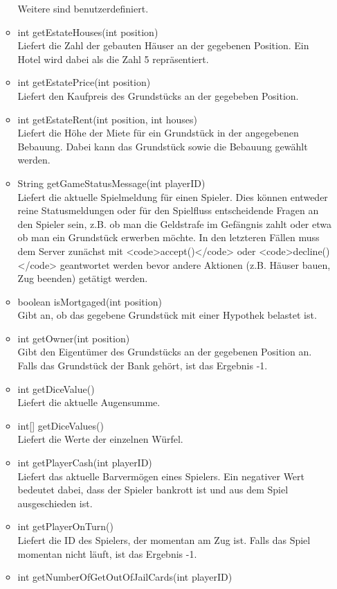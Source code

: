 \documentclass[a4paper,10pt]{article}
\begin{document}
\begin{itemize}
\begin{itemize}
\begin{description}
\end{description}
Weitere sind benutzerdefiniert.
\item int getEstateHouses(int position) \\
Liefert die Zahl der gebauten Häuser an der gegebenen Position. Ein Hotel wird dabei als die Zahl 5 repräsentiert.
\item int getEstatePrice(int position) \\
Liefert den Kaufpreis des Grundstücks an der gegebeben Position.
\item int getEstateRent(int position, int houses) \\
Liefert die Höhe der Miete für ein Grundstück in der angegebenen Bebauung. Dabei kann das Grundstück sowie die Bebauung gewählt werden.
\item String getGameStatusMessage(int playerID) \\
Liefert die aktuelle Spielmeldung für einen Spieler. Dies können entweder reine Statusmeldungen
oder für den Spielfluss entscheidende Fragen an den Spieler sein, z.B. ob man die Geldstrafe im Gefängnis zahlt oder etwa ob
man ein Grundstück erwerben möchte. In den letzteren Fällen muss dem Server zunächst mit <code>accept()</code> oder <code>decline()</code>
geantwortet werden bevor andere Aktionen (z.B. Häuser bauen, Zug beenden) getätigt werden.
\item boolean isMortgaged(int position) \\
Gibt an, ob das gegebene Grundstück mit einer Hypothek belastet ist.
\item int getOwner(int position) \\
Gibt den Eigentümer des Grundstücks an der gegebenen Position an. Falls das Grundstück der Bank gehört, ist das Ergebnis -1.
\item int getDiceValue() \\
Liefert die aktuelle Augensumme.
\item int[] getDiceValues() \\
Liefert die Werte der einzelnen Würfel.
\item int getPlayerCash(int playerID) \\
Liefert das aktuelle Barvermögen eines Spielers. Ein negativer Wert bedeutet dabei, dass der Spieler bankrott ist und aus dem Spiel ausgeschieden ist.
\item int getPlayerOnTurn() \\
Liefert die ID des Spielers, der momentan am Zug ist. Falls das Spiel
momentan nicht läuft, ist das Ergebnis -1.
\item int getNumberOfGetOutOfJailCards(int playerID) \\

\end{itemize}
\end{itemize}
\end{document}
